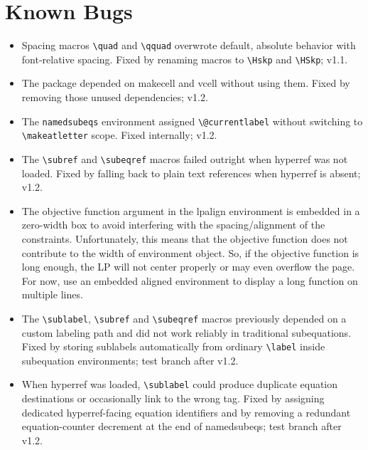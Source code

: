 \documentclass{article}
\begin{document}
\section{Known Bugs}
\begin{itemize}
	\item[$\boxtimes$] Spacing macros \verb|\quad| and \verb|\qquad| overwrote default, absolute behavior with font-relative spacing. Fixed by renaming macros to \verb|\Hskp| and \verb|\HSkp|; v1.1.
	
	\item[$\boxtimes$] The package depended on \textsf{makecell} and \textsf{vcell} without using them. Fixed by removing those unused dependencies; v1.2.
	
	\item[$\boxtimes$] The \verb|namedsubeqs| environment assigned \verb|\@currentlabel| without switching to \verb|\makeatletter| scope. Fixed internally; v1.2.
	
	\item[$\boxtimes$] The \verb|\subref| and \verb|\subeqref| macros failed outright when \textsf{hyperref} was not loaded. Fixed by falling back to plain text references when \textsf{hyperref} is absent; v1.2.
	
	\item[$\boxdot$] The objective function argument in the \textsf{lpalign} environment is embedded in a zero-width box to avoid interfering with the spacing/alignment of the constraints. Unfortunately, this means that the objective function does not contribute to the width of environment object. So, if the objective function is long enough, the LP will not center properly or may even overflow the page. For now, use an embedded \textsf{aligned} environment to display a long function on multiple lines.
	
	\item[$\boxtimes$] The \verb|\sublabel|, \verb|\subref| and \verb|\subeqref| macros previously depended on a custom labeling path and did not work reliably in traditional \textsf{subequations}. Fixed by storing sublabels automatically from ordinary \verb|\label| inside subequation environments; test branch after v1.2.
	
	\item[$\boxtimes$] When \textsf{hyperref} was loaded, \verb|\sublabel| could produce duplicate equation destinations or occasionally link to the wrong tag. Fixed by assigning dedicated hyperref-facing equation identifiers and by removing a redundant equation-counter decrement at the end of \textsf{namedsubeqs}; test branch after v1.2.
	
\end{itemize}
\end{document}
